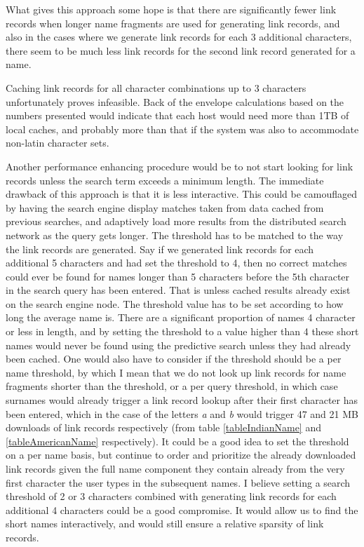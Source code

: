What gives this approach some hope is that there are significantly fewer link records when longer name fragments are used for generating link records, and also in the cases where we generate link records for each 3 additional characters, there seem to be much less link records for the second link record generated for a name.

Caching link records for all character combinations up to 3 characters unfortunately proves infeasible. Back of the envelope calculations based on the numbers presented would indicate that each host would need more than 1TB of local caches, and probably more than that if the system was also to accommodate non-latin character sets.

Another performance enhancing procedure would be to not start looking for link records unless the search term exceeds a minimum length. 
The immediate drawback of this approach is that it is less interactive. This could be camouflaged by having the search engine display matches taken from data cached from previous searches, and adaptively load more results from the distributed search network as the query gets longer.
The threshold has to be matched to the way the link records are generated. Say if we generated link records for each additional 5 characters and had set the threshold to 4, then no correct matches could ever be found for names longer than 5 characters before the 5th character in the search query has been entered. That is unless cached results already exist on the search engine node.
The threshold value has to be set according to how long the average name is. There are a significant proportion of names 4 character or less in length, and by setting the threshold to a value higher than 4 these short names would never be found using the predictive search unless they had already been cached.
One would also have to consider if the threshold should be a per name threshold, by which I mean that we do not look up link records for name fragments shorter than the threshold, or a per query threshold, in which case surnames would already trigger a link record lookup after their first character has been entered, which in the case of the letters \emph{a} and \emph{b} would trigger 47 and 21 MB downloads of link records respectively (from table \ref{tableIndianName} and \ref{tableAmericanName} respectively). It could be a good idea to set the threshold on a per name basis, but continue to order and prioritize the already downloaded link records given the full name component they contain already from the very first character the user types in the subsequent names.
I believe setting a search threshold of 2 or 3 characters combined with generating link records for each additional 4 characters could be a good compromise. It would allow us to find the short names interactively, and would still ensure a relative sparsity of link records.

